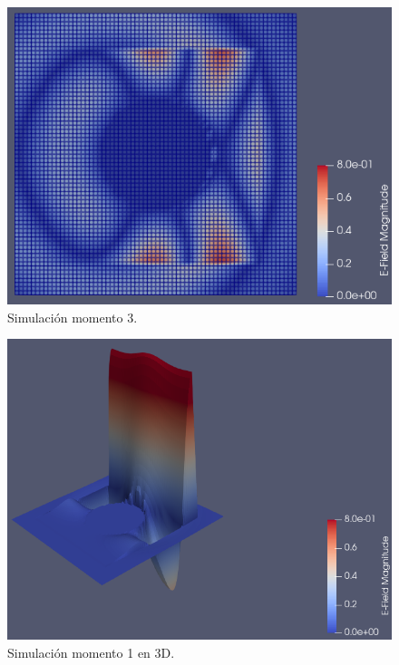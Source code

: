 \documentclass[
    11pt,
    spanish,
	a4paper
]{article}
\begin{document}
\begin{figure}[htbp]
	\centering
	\includegraphics[width=\textwidth]{./img/salida.png}
	\caption{Simulación momento 3.}
	\label{fig:sim6}
\end{figure}

\begin{figure}[htbp]
	\centering
	\includegraphics[width=\textwidth]{./img/impacto3d.png}
	\caption{Simulación momento 1 en 3D.}
	\label{fig:sim7}
\end{figure}
\end{document}
